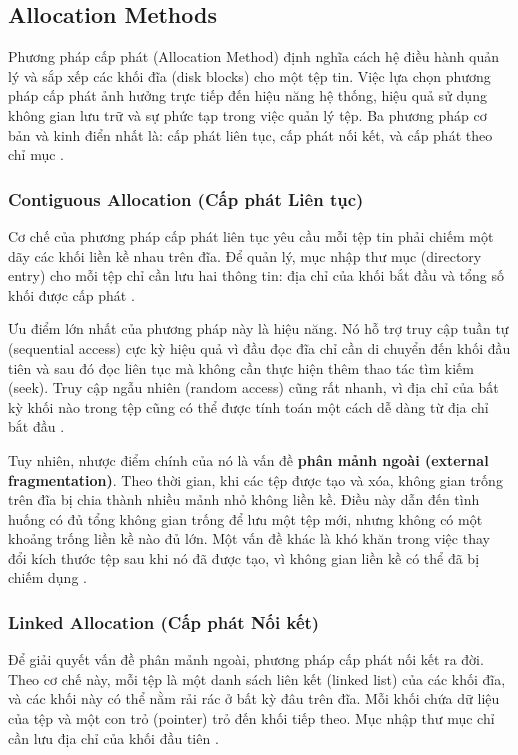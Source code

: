 \documentclass[12pt]{article}
\begin{document}
\subsection{Allocation Methods}
Phương pháp cấp phát (Allocation Method) định nghĩa cách hệ điều hành quản lý và sắp xếp các khối đĩa (disk blocks) cho một tệp tin. Việc lựa chọn phương pháp cấp phát ảnh hưởng trực tiếp đến hiệu năng hệ thống, hiệu quả sử dụng không gian lưu trữ và sự phức tạp trong việc quản lý tệp. Ba phương pháp cơ bản và kinh điển nhất là: cấp phát liên tục, cấp phát nối kết, và cấp phát theo chỉ mục \parencite{Silberschatz2018}.

\subsubsection{Contiguous Allocation (Cấp phát Liên tục)}
Cơ chế của phương pháp cấp phát liên tục yêu cầu mỗi tệp tin phải chiếm một dãy các khối liền kề nhau trên đĩa. Để quản lý, mục nhập thư mục (directory entry) cho mỗi tệp chỉ cần lưu hai thông tin: địa chỉ của khối bắt đầu và tổng số khối được cấp phát \parencite{Tanenbaum2014}.

Ưu điểm lớn nhất của phương pháp này là hiệu năng. Nó hỗ trợ truy cập tuần tự (sequential access) cực kỳ hiệu quả vì đầu đọc đĩa chỉ cần di chuyển đến khối đầu tiên và sau đó đọc liên tục mà không cần thực hiện thêm thao tác tìm kiếm (seek). Truy cập ngẫu nhiên (random access) cũng rất nhanh, vì địa chỉ của bất kỳ khối nào trong tệp cũng có thể được tính toán một cách dễ dàng từ địa chỉ bắt đầu \parencite{Fiveable2025}.

Tuy nhiên, nhược điểm chính của nó là vấn đề \textbf{phân mảnh ngoài (external fragmentation)}. Theo thời gian, khi các tệp được tạo và xóa, không gian trống trên đĩa bị chia thành nhiều mảnh nhỏ không liền kề. Điều này dẫn đến tình huống có đủ tổng không gian trống để lưu một tệp mới, nhưng không có một khoảng trống liền kề nào đủ lớn. Một vấn đề khác là khó khăn trong việc thay đổi kích thước tệp sau khi nó đã được tạo, vì không gian liền kề có thể đã bị chiếm dụng \parencite{Silberschatz2018}.

\subsubsection{Linked Allocation (Cấp phát Nối kết)}
Để giải quyết vấn đề phân mảnh ngoài, phương pháp cấp phát nối kết ra đời. Theo cơ chế này, mỗi tệp là một danh sách liên kết (linked list) của các khối đĩa, và các khối này có thể nằm rải rác ở bất kỳ đâu trên đĩa. Mỗi khối chứa dữ liệu của tệp và một con trỏ (pointer) trỏ đến khối tiếp theo. Mục nhập thư mục chỉ cần lưu địa chỉ của khối đầu tiên \parencite{Silberschatz2018}.
\end{document}

